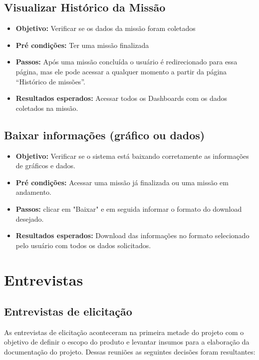 \begin{apendicesenv}
\section{Visualizar Histórico da Missão}
\begin{itemize} 
    \item \textbf{Objetivo:} Verificar se os dados da missão foram coletados
    \item \textbf{Pré condições:} Ter uma missão finalizada
    \item \textbf{Passos:} Após uma missão concluída o usuário é redirecionado para essa página, mas ele pode acessar a qualquer momento a partir da página “Histórico de missões”.
    \item \textbf{Resultados esperados:}  Acessar todos os Dashboards com os dados coletados na missão.
\end{itemize}

\section{Baixar informações (gráfico ou dados)}
\begin{itemize} 
    \item \textbf{Objetivo:} Verificar se o sistema está baixando corretamente as informações de gráficos e dados.
    \item \textbf{Pré condições:} Acessar uma missão já finalizada ou uma missão em andamento.
    \item \textbf{Passos:} clicar em "Baixar" e em seguida informar o formato do download desejado.
    \item \textbf{Resultados esperados:} Download das informações no formato selecionado pelo usuário com todos os dados solicitados.
\end{itemize}

\chapter{Entrevistas}
\label{entrevistas}

\section{Entrevistas de elicitação}

    As entrevistas de elicitação aconteceram na primeira metade do projeto com o objetivo de definir o escopo do produto e levantar insumos para a elaboração da documentação do projeto. Dessas reuniões as seguintes decisões foram resultantes:
    

\end{apendicesenv}
